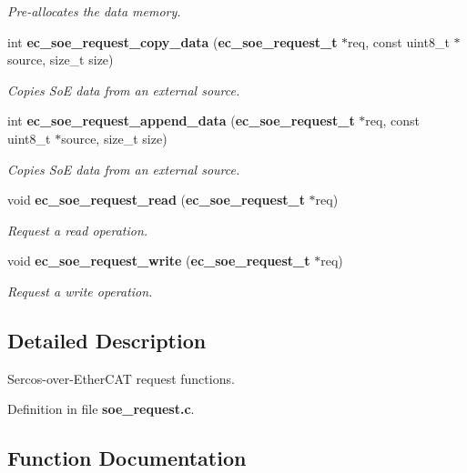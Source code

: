 \begin{DoxyCompactItemize}
\begin{DoxyCompactList}\small\item\em \-Pre-\/allocates the data memory. \end{DoxyCompactList}\item 
int {\bf ec\-\_\-soe\-\_\-request\-\_\-copy\-\_\-data} ({\bf ec\-\_\-soe\-\_\-request\-\_\-t} $\ast$req, const uint8\-\_\-t $\ast$source, size\-\_\-t size)
\begin{DoxyCompactList}\small\item\em \-Copies \-So\-E data from an external source. \end{DoxyCompactList}\item 
int {\bf ec\-\_\-soe\-\_\-request\-\_\-append\-\_\-data} ({\bf ec\-\_\-soe\-\_\-request\-\_\-t} $\ast$req, const uint8\-\_\-t $\ast$source, size\-\_\-t size)
\begin{DoxyCompactList}\small\item\em \-Copies \-So\-E data from an external source. \end{DoxyCompactList}\item 
void {\bf ec\-\_\-soe\-\_\-request\-\_\-read} ({\bf ec\-\_\-soe\-\_\-request\-\_\-t} $\ast$req)
\begin{DoxyCompactList}\small\item\em \-Request a read operation. \end{DoxyCompactList}\item 
void {\bf ec\-\_\-soe\-\_\-request\-\_\-write} ({\bf ec\-\_\-soe\-\_\-request\-\_\-t} $\ast$req)
\begin{DoxyCompactList}\small\item\em \-Request a write operation. \end{DoxyCompactList}\end{DoxyCompactItemize}


\subsection{\-Detailed \-Description}
\-Sercos-\/over-\/\-Ether\-C\-A\-T request functions. 

\-Definition in file {\bf soe\-\_\-request.\-c}.



\subsection{\-Function \-Documentation}
